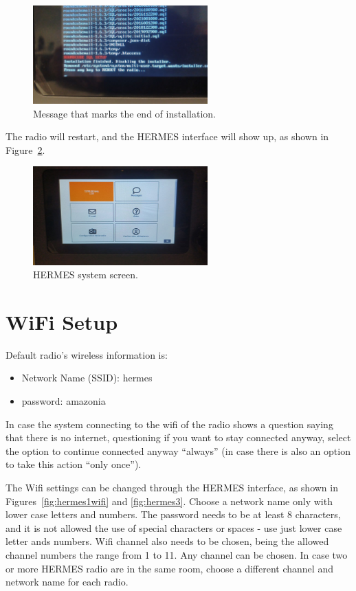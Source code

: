 \documentclass[11pt,a4paper]{article}
\begin{document}
\begin{figure}[H]
  \centering
  \includegraphics[width=0.6\textwidth]{pictures/inst-7.jpg}
  \caption{Message that marks the end of installation.}
  \label{fig:inst7}
\end{figure}

The radio will restart, and the HERMES interface will show up, as shown in Figure~\ref{fig:inst8}.

\begin{figure}[H]
  \centering
  \includegraphics[width=0.6\textwidth]{pictures/inst-8.jpg}
  \caption{HERMES system screen.}
  \label{fig:inst8}
\end{figure}

\section{WiFi Setup}
\label{sec:wifi}

Default radio's wireless information is:
\begin{itemize}
\item Network Name (SSID): hermes
\item password: amazonia
\end{itemize}

In case the system connecting to the wifi of the radio shows a question saying that there is no internet,
questioning if you want to stay connected anyway, select the option to continue connected anyway ``always'' (in
case there is also an option to take this action ``only once'').

The Wifi settings can be changed through the HERMES interface, as shown in Figures~\ref{fig:hermes1wifi} and \ref{fig:hermes3}. Choose a network
name only with lower case letters and numbers. The password needs to be at least 8 characters, and it is not
allowed the use of special characters or spaces - use just lower case letter ands numbers. Wifi channel also needs to be chosen, being the allowed channel numbers the
range from 1 to 11. Any channel can be chosen. In case two or more HERMES radio are in the same room, choose a different channel and network name for each radio.
\end{document}
